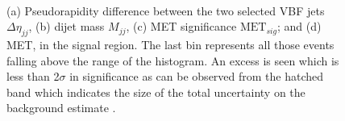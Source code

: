\begin{figure}[!htb]
\centering
{}
 \\
\caption{(a) Pseudorapidity difference between the two selected \gls{VBF} jets $\Delta\eta_{jj}$, (b) dijet mass $M_{jj}$, (c) \gls{MET} significance $\text{MET}_{sig}$; and (d) \gls{MET}, in the signal region. The last bin represents all those events falling above the range of the histogram. An excess is seen which is less than 2$\sigma$ in significance as can be observed from the hatched band which indicates the size of the total uncertainty on the background estimate \cite{ARTICLE:CMSVBFHiggsInvisibleParkedAnalysisPAS}.}
\label{FIGURE:ParkedDataAnalysis_Results_SigRegPlots}
\end{figure}

